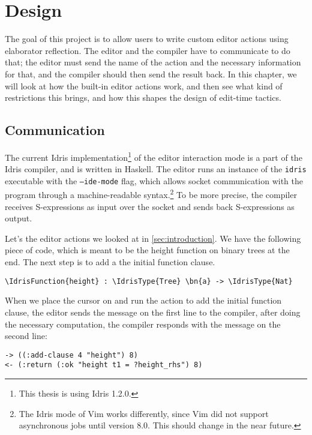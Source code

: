 \section{Design}\label{sec:design}
The goal of this project is to allow users to write custom editor actions using
elaborator reflection.
The editor and the compiler have to communicate to do that; the editor must
send the name of the action and the necessary information for that, and the
compiler should then send the result back.
In this chapter, we will look at how the built-in editor actions work, and then
see what kind of restrictions this brings, and how this shapes the design of
edit-time tactics.

\subsection{Communication}\label{ssec:communication}

The current Idris implementation\footnote{This thesis is using Idris 1.2.0.} of
the editor interaction mode is a part of the Idris compiler, and is written in
Haskell.
The editor runs an instance of the \texttt{idris} executable with the
\texttt{--ide-mode} flag, which
allows socket communication with the program through a machine-readable
syntax.\footnote{The Idris mode of Vim works differently, since Vim did not
support asynchronous jobs until version 8.0. This should change in the near future.}
To be more precise, the compiler receives S-expressions\cite{mccarthy} as input
over the socket and sends back S-expressions as output.

Let's the editor actions we looked at in \autoref{sec:introduction}.
We have the following piece of code, which is meant to be the height function
on binary trees at the end. The next step is to add a the initial function clause.

\begin{Verbatim}[framesep=2mm, label=\footnotesize{\normalfont{Idris}}, labelposition=topline]
\IdrisFunction{height} : \IdrisType{Tree} \bn{a} -> \IdrisType{Nat}
\end{Verbatim}

When we place the cursor on  and run the action to add the initial
function clause, the editor sends the message on the first line to the
compiler, after doing the necessary computation, the compiler responds with the
message on the second line:

\begin{Verbatim}[framesep=2mm, label=\footnotesize{\normalfont{S-expression}}, labelposition=topline]
-> ((:add-clause 4 "height") 8)
<- (:return (:ok "height t1 = ?height_rhs") 8)
\end{Verbatim}

